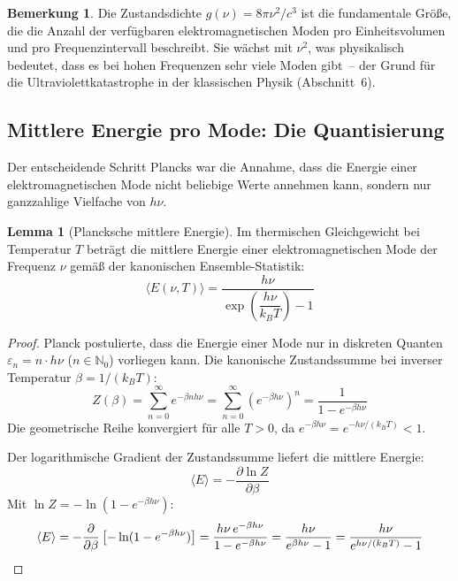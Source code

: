 ﻿\documentclass[a4paper,12pt]{article}
\theoremstyle{definition}
\newtheorem{lemma}{Lemma}
\newtheorem{bemerkung}{Bemerkung}
\begin{document}
\begin{bemerkung}
    Die Zustandsdichte $g(\nu) = 8\pi\nu^2/c^3$ ist die fundamentale Größe,
    die die Anzahl der verfügbaren elektromagnetischen Moden pro Einheitsvolumen
    und pro Frequenzintervall beschreibt. Sie wächst mit $\nu^2$, was physikalisch
    bedeutet, dass es bei hohen Frequenzen sehr viele Moden gibt~-- der Grund
    für die Ultraviolettkatastrophe in der klassischen Physik (Abschnitt~6).
\end{bemerkung}

\subsection{Mittlere Energie pro Mode: Die Quantisierung}

Der entscheidende Schritt Plancks war die Annahme, dass die Energie einer
elektromagnetischen Mode nicht beliebige Werte annehmen kann, sondern nur
ganzzahlige Vielfache von $h\nu$.

\begin{lemma}[Plancksche mittlere Energie]
\label{lem:energie}
    Im thermischen Gleichgewicht bei Temperatur $T$ beträgt die mittlere
    Energie einer elektromagnetischen Mode der Frequenz $\nu$ gemäß der
    kanonischen Ensemble-Statistik:
    \[
        \langle E(\nu, T) \rangle
        = \frac{h\nu}{\exp\!\left(\dfrac{h\nu}{k_B T}\right) - 1}
    \]
\end{lemma}

\begin{proof}
    Planck postulierte, dass die Energie einer Mode nur in diskreten
    Quanten $\varepsilon_n = n \cdot h\nu$ ($n \in \mathbb{N}_0$) vorliegen kann.
    Die kanonische Zustandssumme bei inverser Temperatur $\beta = 1/(k_B T)$:
    \[
        Z(\beta) = \sum_{n=0}^\infty e^{-\beta n h\nu}
        = \sum_{n=0}^\infty \left(e^{-\beta h\nu}\right)^n
        = \frac{1}{1 - e^{-\beta h\nu}}
    \]
    Die geometrische Reihe konvergiert für alle $T > 0$, da
    $e^{-\beta h\nu} = e^{-h\nu/(k_BT)} < 1$.

    Der logarithmische Gradient der Zustandssumme liefert die mittlere Energie:
    \[
        \langle E \rangle = -\frac{\partial \ln Z}{\partial \beta}
    \]
    Mit $\ln Z = -\ln\!\left(1 - e^{-\beta h\nu}\right)$:
    \[
        \langle E \rangle
        = -\frac{\partial}{\partial\beta}\left[-\ln(1 - e^{-\beta h\nu})\right]
        = \frac{h\nu \, e^{-\beta h\nu}}{1 - e^{-\beta h\nu}}
        = \frac{h\nu}{e^{\beta h\nu} - 1}
        = \frac{h\nu}{e^{h\nu/(k_B T)} - 1} \qedhere
    \]
\end{proof}
\end{document}
